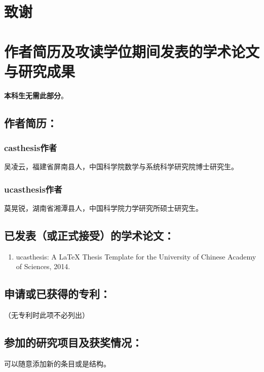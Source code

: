 \chapter[致谢]{致\quad 谢}%



\chapter{作者简历及攻读学位期间发表的学术论文与研究成果}

\textbf{本科生无需此部分}。

\section*{作者简历：}

\subsection*{casthesis作者}

吴凌云，福建省屏南县人，中国科学院数学与系统科学研究院博士研究生。

\subsection*{ucasthesis作者}

莫晃锐，湖南省湘潭县人，中国科学院力学研究所硕士研究生。

\section*{已发表（或正式接受）的学术论文：}

{
\setlist[enumerate]{}%
\begin{enumerate}[nosep]
    \item ucasthesis: A LaTeX Thesis Template for the University of Chinese Academy of Sciences, 2014.
\end{enumerate}
}

\section*{申请或已获得的专利：}

（无专利时此项不必列出）

\section*{参加的研究项目及获奖情况：}

可以随意添加新的条目或是结构。

\cleardoublepage[plain]%
